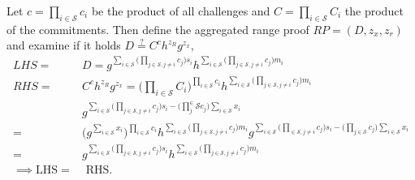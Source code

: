 Let $c=\prod_{i\in\mathcal{S}} c_i$ be the product of all challenges and $C= \prod_{i\in\mathcal{S}} C_i$ the product of the commitments.  Then define the aggregated range proof $RP = (D,z_x,z_r)$ and examine if it holds $D\overset{?}{=} C^ch^{z_R}g^{z_x}$, 
\begin{align*}
LHS =& D = g ^ {\sum_{i\in\mathcal{S}} \Big(\prod_{j\in\mathcal{S}, j\neq i}   c_j \Big)s_i} h^ {\sum_{i\in\mathcal{S}} \Big(\prod_{j\in\mathcal{S}, j\neq i}   c_j \Big)m_i}  \\
RHS =& C^ch^{z_R}g^{z_x} =  \Big( \prod_{i\in\mathcal{S}} C_i \Big)^{\prod_{i\in\mathcal{S}} c_i}h^{\sum_{i\in\mathcal{S}} \Big( \prod_{j\in\mathcal{S}, j\neq i} c_j \Big)m_i}\\
&g^{ \sum_{i\in\mathcal{S}} \Big( \prod_{j\in\mathcal{S}, j\neq i} c_j \Big)s_i - \big( \prod_{j}^\in\mathcal{S} c_j \Big) \sum_{i\in\mathcal{S}} x_i}\\ 
 =& \Big( g^{\sum_{i\in\mathcal{S}} x_i} \Big)^{\prod_{i\in\mathcal{S}} c_i}h^{\sum_{i\in\mathcal{S}} \Big( \prod_{j\in\mathcal{S}, j\neq i} c_j \Big)m_i} g^{ \sum_{i\in\mathcal{S}} \Big( \prod_{\in\mathcal{S}, j\neq i} c_j \Big)s_i - \big( \prod_{j\in\mathcal{S}} c_j \Big) \sum_{i\in\mathcal{S}} x_i} \\
 =&  g^{ \sum_{i\in\mathcal{S}} \Big( \prod_{j\in\mathcal{S}, j\neq i} c_j \Big)s_i } h^{\sum_{i\in\mathcal{S}} \Big( \prod_{j\in\mathcal{S}, j\neq i} c_j \Big)m_i}  
\\ \implies \text{LHS} =& \text{ RHS}.
\end{align*}



